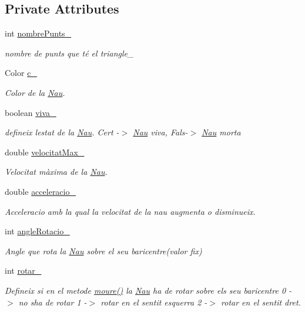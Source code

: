\subsection*{Private Attributes}
\begin{DoxyCompactItemize}
\item 
int \hyperlink{class_nau_adaf4948df660e9cfcac14a3fb75de454}{nombre\+Punts\+\_\+}
\begin{DoxyCompactList}\small\item\em nombre de punts que té el triangle\+\_\+ \end{DoxyCompactList}\item 
Color \hyperlink{class_nau_a5447088ba94469c8f4285650b25211fa}{c\+\_\+}
\begin{DoxyCompactList}\small\item\em Color de la \hyperlink{class_nau}{Nau}. \end{DoxyCompactList}\item 
boolean \hyperlink{class_nau_a165d7613744bb71f472d6bc56aa65540}{viva\+\_\+}
\begin{DoxyCompactList}\small\item\em defineix l\textquotesingle{}estat de la \hyperlink{class_nau}{Nau}. Cert -\/$>$ \hyperlink{class_nau}{Nau} viva, Fals-\/$>$ \hyperlink{class_nau}{Nau} morta \end{DoxyCompactList}\item 
double \hyperlink{class_nau_a6a18449674ed5d2317a6795bd56f7dd0}{velocitat\+Max\+\_\+}
\begin{DoxyCompactList}\small\item\em Velocitat màxima de la \hyperlink{class_nau}{Nau}. \end{DoxyCompactList}\item 
double \hyperlink{class_nau_a03ae6d8631e7668bb556e93e83dbcffd}{acceleracio\+\_\+}
\begin{DoxyCompactList}\small\item\em Acceleracio amb la qual la velocitat de la nau augmenta o disminueix. \end{DoxyCompactList}\item 
int \hyperlink{class_nau_a4a3defe435bcea8864ff9025c740695a}{angle\+Rotacio\+\_\+}
\begin{DoxyCompactList}\small\item\em Angle que rota la \hyperlink{class_nau}{Nau} sobre el seu baricentre(valor fix) \end{DoxyCompactList}\item 
int \hyperlink{class_nau_a128a1860c49ef16bfd63406f4ef0db75}{rotar\+\_\+}
\begin{DoxyCompactList}\small\item\em Defineix si en el metode \hyperlink{class_nau_a8dc46f91e02910b92bfad9b798f6552c}{moure()} la \hyperlink{class_nau}{Nau} ha de rotar sobre els seu baricentre 0 -\/$>$ no s\textquotesingle{}ha de rotar 1 -\/$>$ rotar en el sentit esquerra 2 -\/$>$ rotar en el sentit dret. \end{DoxyCompactList}\end{DoxyCompactItemize}


